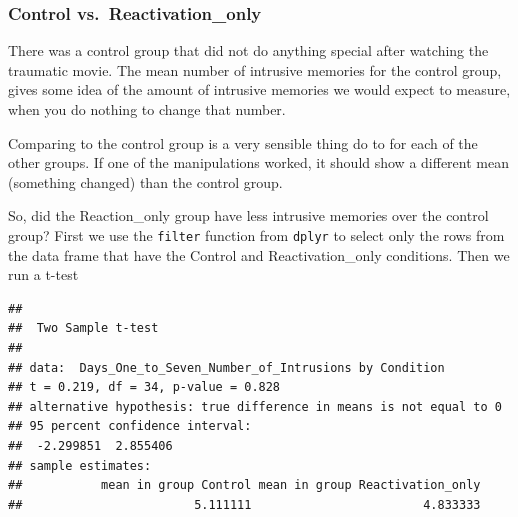 \documentclass[]{book}
\newenvironment{Shaded}{\begin{snugshade}}{\end{snugshade}}
\newcommand{\KeywordTok}[1]{\textcolor[rgb]{0.13,0.29,0.53}{\textbf{#1}}}
\newcommand{\DataTypeTok}[1]{\textcolor[rgb]{0.13,0.29,0.53}{#1}}
\newcommand{\StringTok}[1]{\textcolor[rgb]{0.31,0.60,0.02}{#1}}
\newcommand{\OtherTok}[1]{\textcolor[rgb]{0.56,0.35,0.01}{#1}}
\newcommand{\OperatorTok}[1]{\textcolor[rgb]{0.81,0.36,0.00}{\textbf{#1}}}
\newcommand{\NormalTok}[1]{#1}
\begin{document}
\subsubsection{Control
vs.~Reactivation\_only}\label{control-vs.reactivation_only}

There was a control group that did not do anything special after
watching the traumatic movie. The mean number of intrusive memories for
the control group, gives some idea of the amount of intrusive memories
we would expect to measure, when you do nothing to change that number.

Comparing to the control group is a very sensible thing do to for each
of the other groups. If one of the manipulations worked, it should show
a different mean (something changed) than the control group.

So, did the Reaction\_only group have less intrusive memories over the
control group? First we use the \texttt{filter} function from
\texttt{dplyr} to select only the rows from the data frame that have the
Control and Reactivation\_only conditions. Then we run a t-test

\begin{Shaded}
\end{Shaded}

\begin{verbatim}
## 
##  Two Sample t-test
## 
## data:  Days_One_to_Seven_Number_of_Intrusions by Condition
## t = 0.219, df = 34, p-value = 0.828
## alternative hypothesis: true difference in means is not equal to 0
## 95 percent confidence interval:
##  -2.299851  2.855406
## sample estimates:
##           mean in group Control mean in group Reactivation_only 
##                        5.111111                        4.833333
\end{verbatim}
\end{document}
